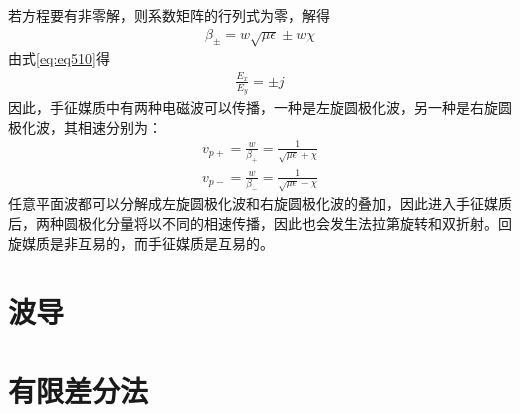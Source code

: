 \documentclass{article}
\numberwithin{equation}{section}
\begin{document}
若方程要有非零解，则系数矩阵的行列式为零，解得
\begin{align}
    \label{eq:eq511}
    \beta_{\pm}=w\sqrt{\mu\epsilon}\pm w\chi
\end{align}
由式\ref{eq:eq510}得
\begin{align}
    \label{eq:eq512}
    \frac{E_x}{E_y}=\pm j
\end{align}
因此，手征媒质中有两种电磁波可以传播，一种是左旋圆极化波，另一种是右旋圆极化波，其相速分别为：
\begin{align}
    \label{eq:eq513}
    v_{p+}=\frac{w}{\beta_+}=\frac{1}{\sqrt{\mu\epsilon}+\chi} \\
    \label{eq:eq514}
    v_{p-}=\frac{w}{\beta_-}=\frac{1}{\sqrt{\mu\epsilon}-\chi}
\end{align}
任意平面波都可以分解成左旋圆极化波和右旋圆极化波的叠加，因此进入手征媒质后，两种圆极化分量将以不同的相速传播，因此也会发生法拉第旋转和双折射。回旋媒质是非互易的，而手征媒质是互易的。
\section{\textsf{波导}}
\newpage
\section{\textsf{有限差分法}}
\label{sec:sec6}
\end{document}
